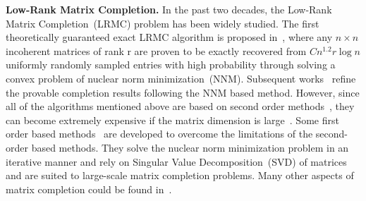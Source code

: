 \textbf{Low-Rank Matrix Completion.} In the past two decades, the Low-Rank Matrix Completion~(LRMC) problem has been widely studied. The first theoretically guaranteed exact LRMC algorithm is proposed in~\cite{candes2009exact}, where any $n \times n$ incoherent matrices of rank r are proven to be exactly recovered from $C n^{1.2}r\log n$ uniformly randomly sampled entries with high probability through solving a convex problem of nuclear norm minimization~(NNM). Subsequent works~\cite{candes2010power, chen2015incoherence, gross2011recovering, recht2011simpler} refine the provable completion results following the NNM based method. However, since all of the algorithms mentioned above are based on second order methods~\cite{liu2010interior}, they can become extremely expensive if the matrix dimension is large~\cite{cai2010singular}. Some first order based methods~\cite{cai2010singular, ji2009accelerated, mazumder2010spectral} are developed to overcome the limitations of the second-order based methods. They solve the nuclear norm minimization problem in an iterative manner and rely on Singular Value Decomposition~(SVD) of matrices and are suited to large-scale matrix completion problems. Many other aspects of matrix completion could be found in~\cite{hastie2015matrix, liu2017new, eriksson2012high, bhojanapalli2014universal, chen2015completing, chen2014coherent, eftekhari2018mc2}.
